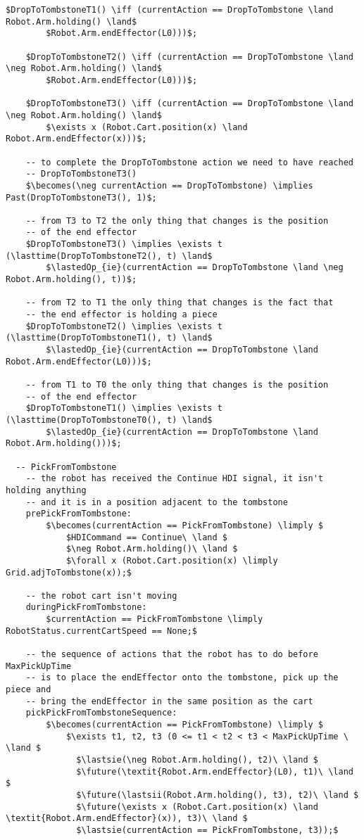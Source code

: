 \begin{lstlisting}[fontadjust, mathescape, frame=single]
    $DropToTombstoneT1() \iff (currentAction == DropToTombstone \land Robot.Arm.holding() \land$
        $Robot.Arm.endEffector(L0)))$;
    
    $DropToTombstoneT2() \iff (currentAction == DropToTombstone \land \neg Robot.Arm.holding() \land$
        $Robot.Arm.endEffector(L0)))$;
    
    $DropToTombstoneT3() \iff (currentAction == DropToTombstone \land \neg Robot.Arm.holding() \land$
        $\exists x (Robot.Cart.position(x) \land Robot.Arm.endEffector(x)))$;
    
    -- to complete the DropToTombstone action we need to have reached
    -- DropToTombstoneT3()
    $\becomes(\neg currentAction == DropToTombstone) \implies Past(DropToTombstoneT3(), 1)$;
    
    -- from T3 to T2 the only thing that changes is the position
    -- of the end effector
    $DropToTombstoneT3() \implies \exists t (\lasttime(DropToTombstoneT2(), t) \land$
        $\lastedOp_{ie}(currentAction == DropToTombstone \land \neg Robot.Arm.holding(), t))$;

    -- from T2 to T1 the only thing that changes is the fact that
    -- the end effector is holding a piece
    $DropToTombstoneT2() \implies \exists t (\lasttime(DropToTombstoneT1(), t) \land$
        $\lastedOp_{ie}(currentAction == DropToTombstone \land Robot.Arm.endEffector(L0)))$;
    
    -- from T1 to T0 the only thing that changes is the position
    -- of the end effector
    $DropToTombstoneT1() \implies \exists t (\lasttime(DropToTombstoneT0(), t) \land$
        $\lastedOp_{ie}(currentAction == DropToTombstone \land Robot.Arm.holding()))$;

  -- PickFromTombstone
    -- the robot has received the Continue HDI signal, it isn't holding anything 
    -- and it is in a position adjacent to the tombstone
    prePickFromTombstone:
        $\becomes(currentAction == PickFromTombstone) \limply $
            $HDICommand == Continue\ \land $
            $\neg Robot.Arm.holding()\ \land $
            $\forall x (Robot.Cart.position(x) \limply Grid.adjToTombstone(x));$

    -- the robot cart isn't moving
    duringPickFromTombstone:
        $currentAction == PickFromTombstone \limply RobotStatus.currentCartSpeed == None;$

    -- the sequence of actions that the robot has to do before MaxPickUpTime 
    -- is to place the endEffector onto the tombstone, pick up the piece and 
    -- bring the endEffector in the same position as the cart
    pickPickFromTombstoneSequence:
        $\becomes(currentAction == PickFromTombstone) \limply $
            $\exists t1, t2, t3 (0 <= t1 < t2 < t3 < MaxPickUpTime \ \land $
              $\lastsie(\neg Robot.Arm.holding(), t2)\ \land $
              $\future(\textit{Robot.Arm.endEffector}(L0), t1)\ \land $
              $\future(\lastsii(Robot.Arm.holding(), t3), t2)\ \land $
              $\future(\exists x (Robot.Cart.position(x) \land \textit{Robot.Arm.endEffector}(x)), t3)\ \land $
              $\lastsie(currentAction == PickFromTombstone, t3));$
    

\end{lstlisting}

